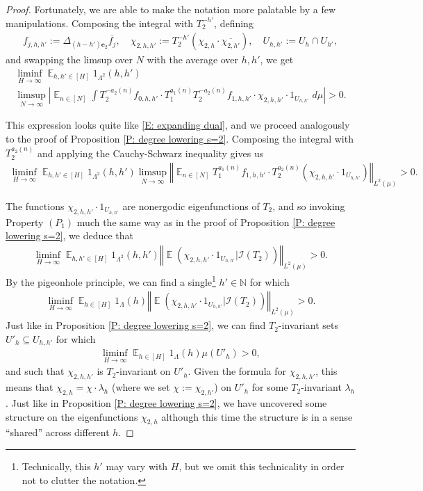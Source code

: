 \documentclass[11pt]{amsart}
\theoremstyle{definition}
\DeclareMathOperator*{\E}{\mathbb{E}}
\newcommand{\N}{{\mathbb N}}
\newcommand{\CI}{{\mathcal I}}
\newcommand{\be}{{\mathbf{e}}}
\newcommand{\norm}[1]{\left\Vert #1\right\Vert}
\newcommand{\1}{{\mathbf{1}}}
\newcommand{\abs}[1]{\mathopen{}\left| #1\mathclose{}\right|}
\begin{document}
\begin{proof}
    Fortunately, we are able to make the notation more palatable by a few manipulations. Composing the integral with $T_2^{-h'}$, defining
    \begin{align*}
        f_{j,h,h'} := \Delta_{(h-h')\be_2}\overline{f_j},\quad \chi_{2,h,h'} := T_2^{-h'}(\chi_{2,h}\cdot\overline{\chi_{2,h'}}),\quad U_{h,h'} := U_h\cap U_{h'},
    \end{align*}
    and swapping the limsup over $N$ with the average over $h,h'$, we get
    \begin{multline*}%
         \liminf_{H\to\infty} \E_{h,h'\in[H]}1_{\Lambda^2}(h,h')\\
         \limsup_{N\to\infty}\abs{\E_{n\in[N]}\int T_2^{-a_2(n)}f_{0,h,h'}\cdot T_1^{a_1(n)}T_2^{-a_2(n)}{f_{1,h,h'}}\cdot \chi_{2,h,h'}\cdot 1_{U_{h,h'}}\; d\mu} > 0.
    \end{multline*}
    
    This expression looks quite like \eqref{E: expanding dual}, and we proceed analogously to the proof of Proposition \ref{P: degree lowering s=2}. Composing the integral with $T_2^{a_2(n)}$ and applying the Cauchy-Schwarz inequality gives us
    \begin{multline*}
        \liminf_{H\to\infty} \E_{h,h'\in[H]}1_{\Lambda^2}(h,h')
         \limsup_{N\to\infty}\norm{\E_{n\in[N]}T_1^{a_1(n)}{f_{1,h,h'}}\cdot T_2^{a_2(n)}(\chi_{2,h,h'}\cdot 1_{U_{h,h'}})}_{L^2(\mu)} > 0.
    \end{multline*}

    The functions $\chi_{2,h,h'}\cdot 1_{U_{h,h'}}$ are nonergodic eigenfunctions of $T_2$, and so invoking Property $(P_1)$ much the same way as in the proof of Proposition \ref{P: degree lowering s=2}, we deduce that 
    \begin{align*}
                \liminf_{H\to\infty} \E_{h,h'\in[H]}1_{\Lambda^2}(h,h')
         \norm{\E(\chi_{2,h,h'}\cdot 1_{U_{h,h'}}|\CI(T_2))}_{L^2(\mu)} > 0.
    \end{align*}
    By the pigeonhole principle, we can find a single\footnote{Technically, this $h'$ may vary with $H$, but we omit this technicality in order not to clutter the notation.} $h'\in\N$ for which
    \begin{align*}
                \liminf_{H\to\infty} \E_{h\in[H]}1_{\Lambda}(h)
         \norm{\E(\chi_{2,h,h'}\cdot 1_{U_{h,h'}}|\CI(T_2))}_{L^2(\mu)} > 0.
    \end{align*}
    Just like in Proposition \ref{P: degree lowering s=2}, we can find $T_2$-invariant sets $U'_h\subseteq U_{h,h'}$ for which
    \begin{align}\label{E: structure on s=3}
        \liminf_{H\to\infty} \E_{h\in[H]}1_{\Lambda}(h)
         \mu(U'_h) > 0,
    \end{align}    
    and such that $\chi_{2,h,h'}$ is $T_2$-invariant on $U'_h$. Given the formula for $\chi_{2,h,h'}$, this means that $\chi_{2,h} = \chi\cdot\lambda_h$ (where we set $\chi:=\chi_{2,h'}$) on $U'_h$ for some $T_2$-invariant $\lambda_h$. Just like in Proposition \ref{P: degree lowering s=2}, we have uncovered some structure on the eigenfunctions $\chi_{2,h}$ although this time the structure is in a sense ``shared'' across different $h$. 


\end{proof}
\end{document}

